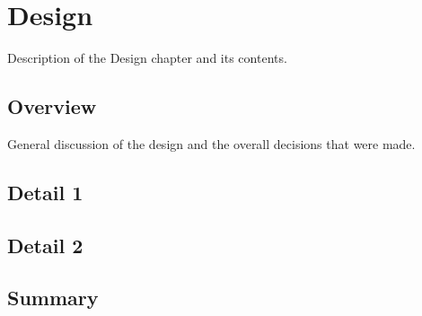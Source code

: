 \chapter{Design}

Description of the Design chapter and its contents.


\section{Overview}

General discussion of the design and the overall decisions that were made.



\section{Detail 1}




\section{Detail 2}




\section{Summary}